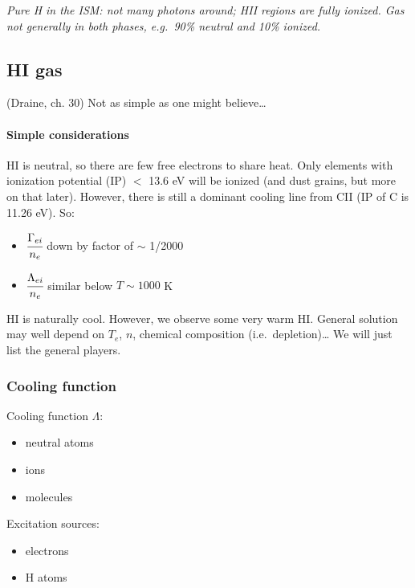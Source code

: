 \documentclass[11pt]{article}
\newcommand{\mar}[1]{\hspace{0pt}\marginpar{-\textcolor{black}{#1}-}}
\newcommand{\mynotes}[1]{{\fontfamily{cmss}\selectfont \textit{#1}}}
\begin{document}
\mynotes{Pure H in the ISM: not many photons around; HII regions are fully
ionized. Gas not generally in both phases, e.g.\ 90\% neutral and 10\% ionized.}

\subsection{HI gas}\mar{160}
(Draine, ch. 30)
Not as simple as one might believe\ldots

\paragraph{Simple considerations} HI is neutral, so there are few free
electrons to share heat. Only elements with ionization potential (IP) $<$ 13.6
eV will be ionized (and dust grains, but more on that later). However, there is
still a dominant cooling line from CII (IP of C is 11.26 eV). So:
\begin{itemize}
    \item $\cfrac{\Gamma_{ei}}{n_{e}} $ down by factor of $\sim$ 1/2000
    \item $\cfrac{\Lambda_{ei}}{n_{e}} $ similar below $T \sim 1000$ K
\end{itemize}
HI is naturally cool. However, we observe some very warm HI. General solution
may well depend on $T_{e}$, $n$, chemical composition (i.e.\ depletion)\ldots
We will just list the general players.

\subsubsection{Cooling function}
\begin{minipage}[t]{0.5\textwidth}
Cooling function $\Lambda$:
\begin{itemize}
    \item neutral atoms
    \item ions
    \item molecules
\end{itemize}
\end{minipage}
\begin{minipage}[t]{0.5\textwidth}
Excitation sources:
\begin{itemize}
    \item electrons
    \item H atoms
\end{itemize}
\end{minipage}
\end{document}
